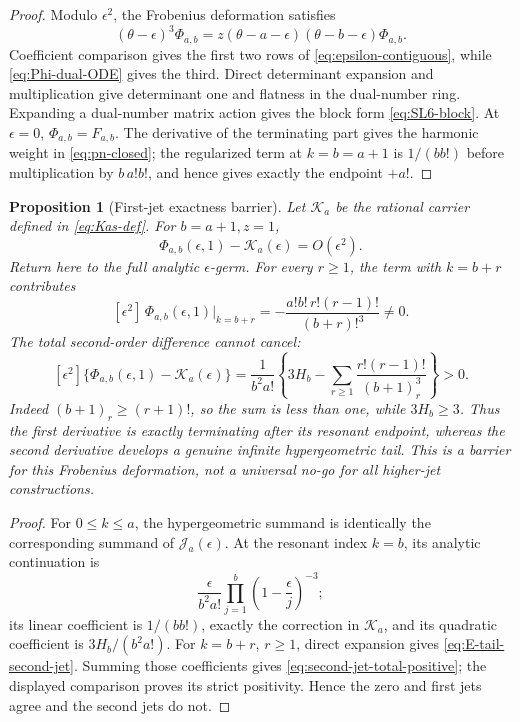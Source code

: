\documentclass[11pt]{article}
\newtheorem{proposition}[theorem]{Proposition}
\theoremstyle{definition}
\theoremstyle{remark}
\begin{document}
\begin{proof}
Modulo \(\epsilon^2\), the Frobenius deformation satisfies
\begin{equation}\label{eq:Phi-dual-ODE}
 (\theta-\epsilon)^3\Phi_{a,b}
 =z(\theta-a-\epsilon)(\theta-b-\epsilon)\Phi_{a,b}.
\end{equation}
Coefficient comparison gives the first two rows of
\eqref{eq:epsilon-contiguous}, while \eqref{eq:Phi-dual-ODE} gives the third.
Direct determinant expansion and multiplication give determinant one and
flatness in the dual-number ring.  Expanding a
dual-number matrix action gives the block form \eqref{eq:SL6-block}.
At \(\epsilon=0\), \(\Phi_{a,b}=F_{a,b}\).  The derivative of the terminating
part gives the harmonic weight in \eqref{eq:pn-closed}; the regularized term
at \(k=b=a+1\) is \(1/(bb!)\) before multiplication by \(b\,a!b!\), and
hence gives exactly the endpoint \(+a!\).
\end{proof}

\begin{proposition}[First-jet exactness barrier]
\label{prop:first-jet-barrier}
Let \(\mathscr K_a\) be the rational carrier defined in
\eqref{eq:Kas-def}.  For \(b=a+1,z=1\),
\begin{equation}\label{eq:Phi-K-contact}
 \Phi_{a,b}(\epsilon,1)-\mathscr K_a(\epsilon)=O(\epsilon^2).
\end{equation}
Return here to the full analytic \(\epsilon\)-germ.  For every \(r\ge1\),
the term with \(k=b+r\) contributes
\begin{equation}\label{eq:E-tail-second-jet}
 [\epsilon^2]\,\Phi_{a,b}(\epsilon,1)\big|_{k=b+r}
 =-\frac{a!b!\,r!(r-1)!}{(b+r)!^3}\ne0.
\end{equation}
The total second-order difference cannot cancel:
\begin{equation}\label{eq:second-jet-total-positive}
 [\epsilon^2]\{\Phi_{a,b}(\epsilon,1)-\mathscr K_a(\epsilon)\}
 =
 \frac1{b^2a!}\left\{
 3H_b-\sum_{r\ge1}\frac{r!(r-1)!}{(b+1)_r^3}\right\}>0.
\end{equation}
Indeed \((b+1)_r\ge(r+1)!\), so the sum is less than one, while
\(3H_b\ge3\).
Thus the first derivative is exactly terminating after its resonant endpoint,
whereas the second derivative develops a genuine infinite hypergeometric
tail.  This is a barrier for this Frobenius deformation, not a universal
no-go for all higher-jet constructions.
\end{proposition}

\begin{proof}
For \(0\le k\le a\), the hypergeometric summand is identically the
corresponding summand of \(\mathscr J_a(\epsilon)\).  At the resonant index
\(k=b\), its analytic continuation is
\[
 \frac{\epsilon}{b^2a!}
 \prod_{j=1}^b\left(1-\frac{\epsilon}{j}\right)^{-3};
\]
its linear coefficient is \(1/(bb!)\), exactly the correction in
\(\mathscr K_a\), and its quadratic coefficient is
\(3H_b/(b^2a!)\).  For \(k=b+r\), \(r\ge1\), direct expansion gives
\eqref{eq:E-tail-second-jet}.  Summing those coefficients gives
\eqref{eq:second-jet-total-positive}; the displayed comparison proves its
strict positivity.  Hence the zero and first jets agree and the second
jets do not.
\end{proof}
\end{document}
